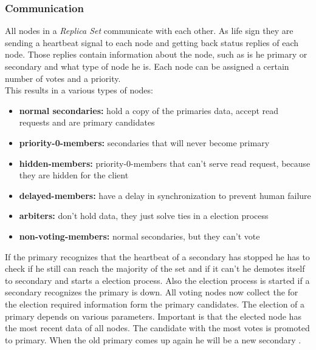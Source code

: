\subsubsection{Communication}
All nodes in a \textit{Replica Set} communicate with each other. As life sign they are sending a heartbeat signal to each node and getting back status replies of each node. Those replies contain information about the node, such as is he primary or secondary and what type of node he is. Each node can be assigned a certain number of votes and a priority.\\
This results in a various types of nodes:
\begin{itemize}
  \item \textbf{normal secondaries:} hold a copy of the primaries data, accept read requests and are primary candidates
  \item \textbf{priority-0-members:} secondaries that will never become primary
  \item \textbf{hidden-members:} priority-0-members that can't serve read request, because they are hidden for the client
  \item \textbf{delayed-members:} have a delay in synchronization to prevent human failure
  \item \textbf{arbiters:} don't hold data, they just solve ties in a election process
  \item \textbf{non-voting-members:} normal secondaries, but they can't vote
\end{itemize}
If the primary recognizes that the heartbeat of a secondary has stopped he has to check if he still can reach the majority of the set and if it can't he demotes itself to secondary and starts a election process. Also the election process is started if a secondary recognizes the primary is down. All voting nodes now collect the for the election required information form the primary candidates. The election of a primary depends on various parameters. Important is that the elected node has the most recent data of all nodes. The candidate with the most votes is promoted to primary. When the old primary comes up again he will be a new secondary \cite{Edward2015,Hows2013}.

